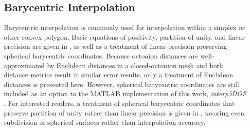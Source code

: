 \documentclass[preprint,12pt]{elsarticle}
\begin{document}

    


\subsection{Barycentric Interpolation} \label{sec:methods:bary}

Barycentric interpolation is commonly used for interpolation within a simplex or other convex polygon. Basic equations of positivity, partition of unity, and linear precision are given in \cite{langerSphericalBarycentricCoordinates2006}, as well as a treatment of linear-precision preserving spherical barycentric coordinates. Because octonion distances are well-approximated by Euclidean distances in a closed-octonion mesh and both distance metrics result in similar error results, only a treatment of Euclidean distances is presented here. However, spherical barycentric coordinates are still included as an option to the MATLAB implementation of this work, \textit{interp5DOF} \cite{bairdFiveDegreeofFreedom5DOF2020}. For interested readers, a treatment of spherical barycentric coordinates that preserve partition of unity rather than linear-precision is given in \cite{leiNewCoordinateSystem2020}, favoring even subdivision of spherical surfaces rather than interpolation accuracy.
\end{document}
